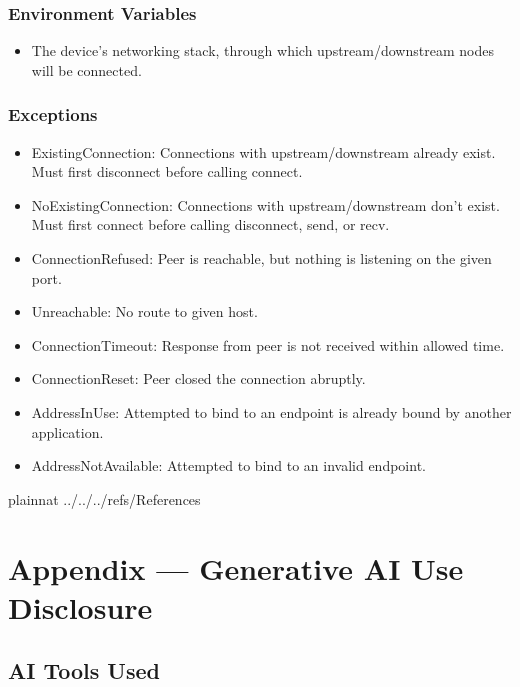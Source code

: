 \documentclass[12pt, titlepage]{article}
\begin{document}
\subsubsection{Environment Variables}

\begin{itemize}
	\item The device's networking stack, through which upstream/downstream nodes will be connected.
\end{itemize}

\subsubsection{Exceptions}
\begin{itemize}
	\item ExistingConnection: Connections with upstream/downstream already exist. Must first
		disconnect before calling connect.
	\item NoExistingConnection: Connections with upstream/downstream don't exist. Must first connect
		before calling disconnect, send, or recv.
	\item ConnectionRefused: Peer is reachable, but nothing is listening on the given port.
	\item Unreachable: No route to given host.
	\item ConnectionTimeout: Response from peer is not received within allowed time.
	\item ConnectionReset: Peer closed the connection abruptly.
	\item AddressInUse: Attempted to bind to an endpoint is already bound by another application.
	\item AddressNotAvailable: Attempted to bind to an invalid endpoint.
\end{itemize}

\newpage

 {plainnat}
 {../../../refs/References}

\newpage

\newpage{}

\section{Appendix --- Generative AI Use Disclosure}

\subsection{AI Tools Used}
\end{document}
